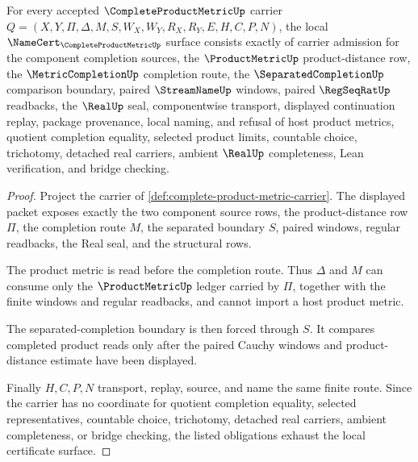 \begin{theorem}
\label{thm:complete-product-metric-namecert-obligations}
For every accepted $\CompleteProductMetricUp$ carrier $Q=(X,Y,\Pi,\Delta,M,S,W_X,W_Y,R_X,R_Y,E,H,C,P,N)$, the local $\NameCert_{\CompleteProductMetricUp}$ surface consists exactly of carrier admission for the component completion sources, the $\ProductMetricUp$ product-distance row, the $\MetricCompletionUp$ completion route, the $\SeparatedCompletionUp$ comparison boundary, paired $\StreamNameUp$ windows, paired $\RegSeqRatUp$ readbacks, the $\RealUp$ seal, componentwise transport, displayed continuation replay, package provenance, local naming, and refusal of host product metrics, quotient completion equality, selected product limits, countable choice, trichotomy, detached real carriers, ambient $\RealUp$ completeness, Lean verification, and bridge checking.
\end{theorem}
\begin{proof}
Project the carrier of \autoref{def:complete-product-metric-carrier}. The displayed packet exposes exactly the two component source rows, the product-distance row $\Pi$, the completion route $M$, the separated boundary $S$, paired windows, regular readbacks, the Real seal, and the structural rows.

The product metric is read before the completion route. Thus $\Delta$ and $M$ can consume only the $\ProductMetricUp$ ledger carried by $\Pi$, together with the finite windows and regular readbacks, and cannot import a host product metric.

The separated-completion boundary is then forced through $S$. It compares completed product reads only after the paired Cauchy windows and product-distance estimate have been displayed.

Finally $H,C,P,N$ transport, replay, source, and name the same finite route. Since the carrier has no coordinate for quotient completion equality, selected representatives, countable choice, trichotomy, detached real carriers, ambient completeness, or bridge checking, the listed obligations exhaust the local certificate surface.
\end{proof}



